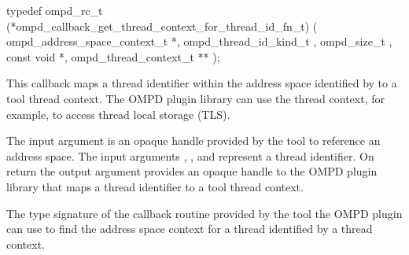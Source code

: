 \cspecificstart
\begin{ompSyntax}
typedef ompd_rc_t
(*ompd_callback_get_thread_context_for_thread_id_fn_t) (
  ompd_address_space_context_t *,
  ompd_thread_id_kind_t ,
  ompd_size_t ,
  const void *,
  ompd_thread_context_t **
);
\end{ompSyntax}
\cspecificend


\descr

This callback maps a thread identifier within the address
space identified by  to a tool thread context. The OMPD plugin library 
can use the thread context, for example, to access
thread local storage (TLS).

\argdesc

The input argument  is an opaque handle provided by the tool
to reference an address space.
The input arguments ,  , and  represent a thread identifier. 
On return the output argument  provides an opaque handle to the OMPD 
plugin library that maps a thread identifier to a tool thread context.





\label{ompd:ompd_callback_get_address_space_context_for_thread_fn_t}

\summary
The type signature of the callback routine provided by the 
tool the OMPD plugin can use to find the address space context
for a thread identified by a thread context.


